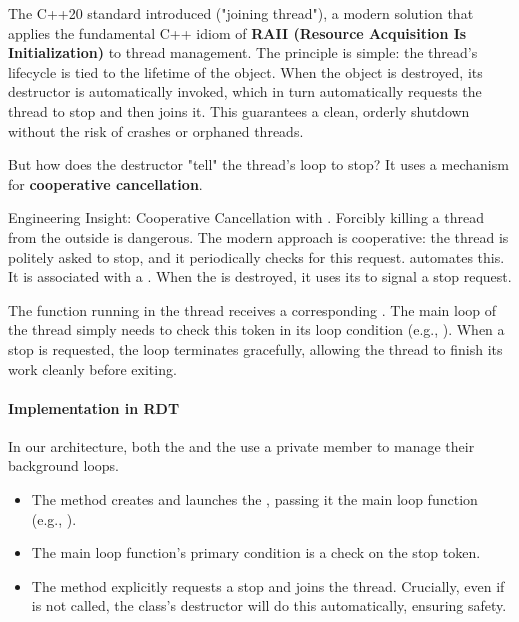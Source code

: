 The C++20 standard introduced \textbf{} ("joining thread"), a modern solution that applies the fundamental C++ idiom of \textbf{RAII (Resource Acquisition Is Initialization)} to thread management. The principle is simple: the thread's lifecycle is tied to the lifetime of the  object. When the object is destroyed, its destructor is automatically invoked, which in turn automatically requests the thread to stop and then joins it. This guarantees a clean, orderly shutdown without the risk of crashes or orphaned threads.

But how does the destructor "tell" the thread's loop to stop? It uses a mechanism for \textbf{cooperative cancellation}.

\begin{tipbox}{Engineering Insight: Cooperative Cancellation with .}
    Forcibly killing a thread from the outside is dangerous. The modern approach is cooperative: the thread is politely asked to stop, and it periodically checks for this request.  automates this. It is associated with a . When the  is destroyed, it uses its  to signal a stop request.
    
    The function running in the thread receives a corresponding \textbf{}. The main loop of the thread simply needs to check this token in its loop condition (e.g., ). When a stop is requested, the loop terminates gracefully, allowing the thread to finish its work cleanly before exiting.
\end{tipbox}

\paragraph{Implementation in RDT}
In our architecture, both the  and the  use a private  member to manage their background loops.
\begin{itemize}
    \item The  method creates and launches the , passing it the main loop function (e.g., ).
    \item The main loop function's primary condition is a check on the stop token.
    \item The  method explicitly requests a stop and joins the thread. Crucially, even if  is not called, the class's destructor will do this automatically, ensuring safety.
\end{itemize}

